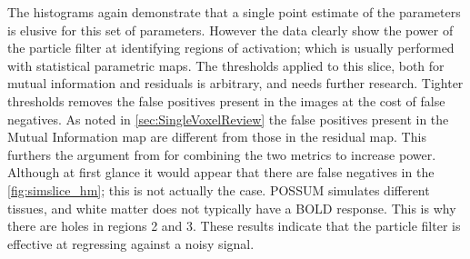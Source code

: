 The histograms again demonstrate that a single point estimate of the parameters 
is elusive for this set of parameters. However the data clearly show the power
of the particle filter at identifying regions of activation; which is usually
performed with statistical parametric maps. The thresholds applied to this
slice, both for mutual information and residuals is arbitrary, and needs further
research. Tighter thresholds removes the false positives present
in the images at the cost of false negatives. As noted in \autoref{sec:SingleVoxelReview}
the false positives present in the Mutual Information
map are different from those in the residual map. This furthers the argument from
for combining the two metrics to increase power. Although
at first glance it would appear that there are false negatives in the 
\autoref{fig:simslice_hm}; this is
not actually the case. POSSUM simulates different tissues, and white matter
does not typically  have a BOLD response. This is why there are holes in regions
2 and 3. These results indicate that the particle filter is effective
at regressing against a noisy signal. 

